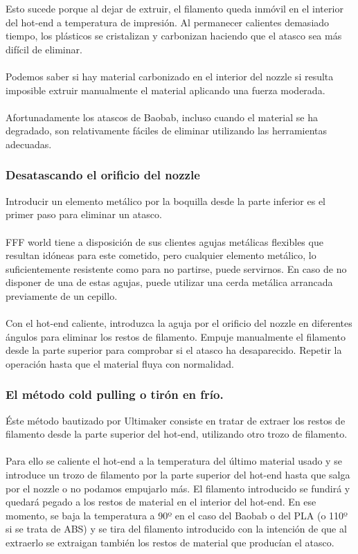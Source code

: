 \documentclass[11pt,a4paper]{article}
\begin{document}
Esto sucede porque al dejar de extruir, el filamento queda inmóvil en el interior del hot-end a temperatura de impresión. Al permanecer calientes demasiado tiempo, los plásticos se cristalizan y carbonizan haciendo que el atasco sea más difícil de eliminar.\\\\
Podemos saber si hay material carbonizado en el interior del nozzle si resulta imposible extruir manualmente el material aplicando una fuerza moderada.\\\\
Afortunadamente los atascos de Baobab, incluso cuando el material se ha degradado, son relativamente fáciles de eliminar utilizando las herramientas adecuadas.	\subsubsection{Desatascando el orificio del nozzle}
Introducir un elemento metálico por la boquilla desde la parte inferior es el primer paso para eliminar un atasco.\\\\
FFF world tiene a disposición de sus clientes agujas metálicas flexibles que resultan idóneas para este cometido, pero cualquier elemento metálico, lo suficientemente resistente como para no partirse, puede servirnos. En caso de no disponer de una de estas agujas, puede utilizar una cerda metálica arrancada previamente de un cepillo.\\\\
Con el hot-end caliente, introduzca la aguja por el orificio del nozzle en diferentes ángulos para eliminar los restos de filamento. Empuje manualmente el filamento desde la parte superior para comprobar si el atasco ha desaparecido. Repetir la operación hasta que el material fluya con normalidad.	\subsubsection{El método cold pulling o tirón en frío.}
Éste método bautizado por Ultimaker consiste en tratar de extraer los restos de filamento desde la parte superior del hot-end, utilizando otro trozo de filamento.\\\\
Para ello se caliente el hot-end a la temperatura del último material usado y se introduce un trozo de filamento por la parte superior del hot-end hasta que salga por el nozzle o no podamos empujarlo más. El filamento introducido se fundirá y quedará pegado a los restos de material en el interior del hot-end. En ese momento, se baja la temperatura a 90º en el caso del Baobab o del PLA (o 110º si se trata de ABS) y se tira del filamento introducido con la intención de que al extraerlo se extraigan también los restos de material que producían el atasco.\\\\
\end{document}
